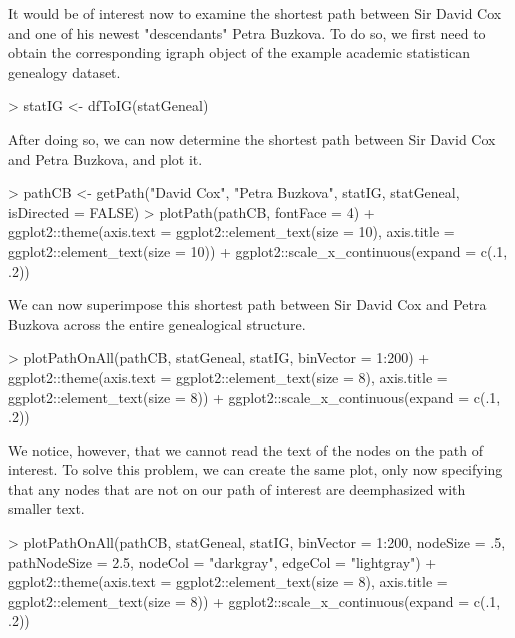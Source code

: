 \documentclass{article}
\begin{document}
It would be of interest now to examine the shortest path between Sir David Cox and one of his newest "descendants" Petra Buzkova. To do so, we first need to obtain the corresponding igraph object of the example academic statistican genealogy dataset.

\begin{Schunk}
\begin{Sinput}
> statIG <- dfToIG(statGeneal)
\end{Sinput}
\end{Schunk}

After doing so, we can now determine the shortest path between Sir David Cox and Petra Buzkova, and plot it.

\begin{Schunk}
\begin{Sinput}
> pathCB <- getPath("David Cox", "Petra Buzkova", statIG, statGeneal, isDirected = FALSE)
> plotPath(pathCB, fontFace = 4) + ggplot2::theme(axis.text = ggplot2::element_text(size = 10), axis.title = ggplot2::element_text(size = 10)) + ggplot2::scale_x_continuous(expand = c(.1, .2))
\end{Sinput}
\end{Schunk}

We can now superimpose this shortest path between Sir David Cox and Petra Buzkova across the entire genealogical structure.

\begin{Schunk}
\begin{Sinput}
> plotPathOnAll(pathCB, statGeneal, statIG, binVector = 1:200) + ggplot2::theme(axis.text = ggplot2::element_text(size = 8), axis.title = ggplot2::element_text(size = 8)) + ggplot2::scale_x_continuous(expand = c(.1, .2))
\end{Sinput}
\end{Schunk}

We notice, however, that we cannot read the text of the nodes on the path of interest. To solve this problem, we can create the same plot, only now specifying that any nodes that are not on our path of interest are deemphasized with smaller text.

\begin{Schunk}
\begin{Sinput}
> plotPathOnAll(pathCB, statGeneal, statIG, binVector = 1:200, nodeSize = .5, pathNodeSize = 2.5, nodeCol = "darkgray", edgeCol = "lightgray") + ggplot2::theme(axis.text = ggplot2::element_text(size = 8), axis.title = ggplot2::element_text(size = 8)) + ggplot2::scale_x_continuous(expand = c(.1, .2))
\end{Sinput}
\end{Schunk}
\end{document}
